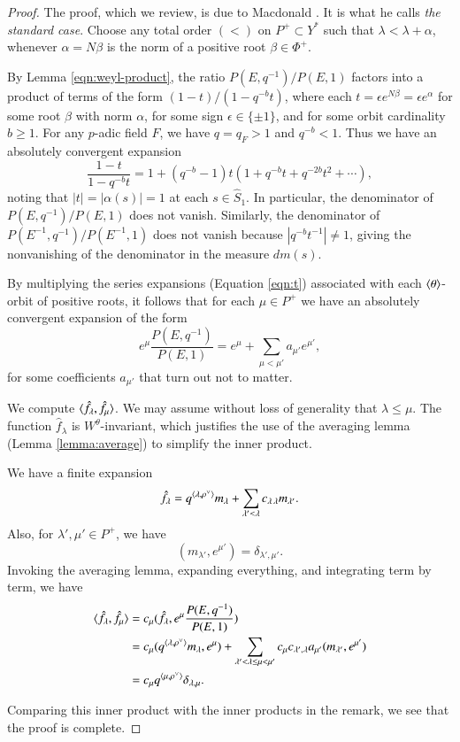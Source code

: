 \begin{proof}  
The proof, which we review, is due to Macdonald \cite[Ch.V]{macdonaldspherical}.
It is what he calls {\it the standard case}.  
Choose any total order $(<)$ on $P^+\subset Y^*$ such that 
$\lambda < \lambda + \alpha$, whenever $\alpha = N\beta$ is the norm of a positive root $\beta\in\Phi^+$.

By Lemma \ref{eqn:weyl-product},
the ratio $P(E,q^{-1})/P(E,1)$  factors into a product of terms of the form $(1- t)/(1- q^{-b} t)$, 
where each $t = \epsilon e^{N\beta} = \epsilon e^\alpha$ for
some root $\beta$ with norm $\alpha$, 
for some sign $\epsilon\in \{\pm 1\}$, and for some orbit cardinality $b\ge 1$.
For any $p$-adic field $F$, we have $q = q_F > 1$ and $q^{-b} < 1$.  Thus we have an absolutely convergent 
expansion
\begin{equation}\label{eqn:t}
\frac{1- t}{1- q^{-b} t} = 1 + (q^{-b}-1) t (1+ q^{-b} t + q^{-2b} t^2 + \cdots),
\end{equation}
noting that $|t| = |\alpha(s)|=1$ at each $s\in \hat S_1$.  In particular, the denominator of $P(E,q^{-1})/P(E,1)$ does not
vanish.  Similarly, the
denominator of $P(E^{-1},q^{-1})/P(E^{-1},1)$ does not vanish because $|q^{-b} t^{-1}|\ne1$, giving the nonvanishing of the
denominator in the measure $dm(s)$.

By multiplying the series expansions (Equation \ref{eqn:t}) associated with each $\langle{\theta}\rangle$-orbit of positive roots,
it follows that for each $\mu\in P^+$ we have an absolutely convergent expansion of the form
\[
e^\mu \frac{P(E,q^{-1})}{P(E,1)} = e^\mu +\sum_{\mu< \mu'} a_{\mu'} e^{\mu'},
\] 
for some coefficients $a_{\mu'}$ that turn out not to matter.

We compute $\langle{\hat f_\lambda,\hat f_\mu}\rangle$.
We may assume without loss of generality that $\lambda \le \mu$.
The function $\hat f_\lambda$ is $W^\theta$-invariant, which justifies the use of 
the averaging lemma (Lemma \ref{lemma:average}) to simplify the inner product.

We have a finite expansion
\[
\hat f_\lambda = q^{\langle{\lambda,\rho^\vee}\rangle} m_\lambda + \sum_{\lambda' <\lambda } c_{\lambda\,\lambda} m_{\lambda'}.
\]
Also, for $\lambda',\mu'\in P^+$, we have
\[
(m_{\lambda'},e^{\mu'}) = \delta_{\lambda',{\mu'}}.
\]
Invoking the averaging lemma, expanding everything, and integrating term by term, we have
\begin{align*}
\langle{\hat f_\lambda,\hat f_\mu}\rangle &= c_\mu (\hat f_\lambda, e^\mu \frac{ P(E,q^{-1})}{P(E,1)})\\
&= c_\mu (q^{\langle{\lambda,\rho^\vee}\rangle} m_\lambda,e^\mu) + \sum_{\lambda' < \lambda\le\mu < \mu'}
c_\mu c_{\lambda',\lambda} a_{\mu'} (m_{\lambda'},e^{\mu'})\\ 
&= c_\mu q^{\langle{\mu,\rho^\vee}\rangle} \delta_{\lambda,\mu}.
\end{align*}

Comparing this inner product with the  inner products in the remark, we see that the proof is 
complete.
\end{proof}




